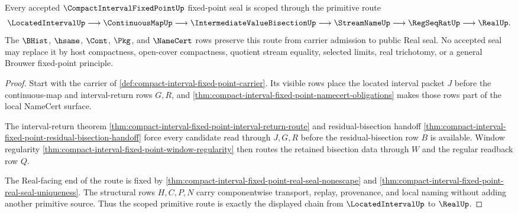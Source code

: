 \begin{theorem}\label{thm:compact-interval-fixed-point-scope-route}
Every accepted $\CompactIntervalFixedPointUp$ fixed-point seal is scoped through the primitive route
$$
\LocatedIntervalUp\longrightarrow\ContinuousMapUp\longrightarrow\IntermediateValueBisectionUp\longrightarrow\StreamNameUp\longrightarrow\RegSeqRatUp\longrightarrow\RealUp .
$$
The $\BHist$, $\hsame$, $\Cont$, $\Pkg$, and $\NameCert$ rows preserve this route from carrier admission to public Real seal. No accepted seal may replace it by host compactness, open-cover compactness, quotient stream equality, selected limits, real trichotomy, or a general Brouwer fixed-point principle.
\end{theorem}
\begin{proof}
Start with the carrier of \autoref{def:compact-interval-fixed-point-carrier}. Its visible rows place the located interval packet $J$ before the continuous-map and interval-return rows $G,R$, and \autoref{thm:compact-interval-fixed-point-namecert-obligations} makes those rows part of the local NameCert surface.

The interval-return theorem \autoref{thm:compact-interval-fixed-point-interval-return-route} and residual-bisection handoff \autoref{thm:compact-interval-fixed-point-residual-bisection-handoff} force every candidate read through $J,G,R$ before the residual-bisection row $B$ is available. Window regularity \autoref{thm:compact-interval-fixed-point-window-regularity} then routes the retained bisection data through $W$ and the regular readback row $Q$.

The Real-facing end of the route is fixed by \autoref{thm:compact-interval-fixed-point-real-seal-nonescape} and \autoref{thm:compact-interval-fixed-point-real-seal-uniqueness}. The structural rows $H,C,P,N$ carry componentwise transport, replay, provenance, and local naming without adding another primitive source. Thus the scoped primitive route is exactly the displayed chain from $\LocatedIntervalUp$ to $\RealUp$.
\end{proof}

